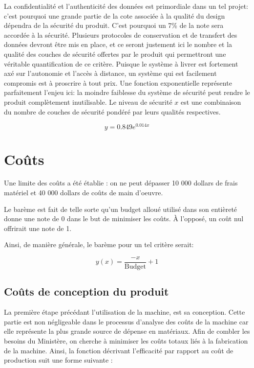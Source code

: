 La confidentialité et l'authenticité des données est primordiale dans un tel projet: c'est pourquoi une grande partie de la cote associée à la qualité du design dépendra de la sécurité du produit. C'est pourquoi un 7\% de la note sera accordée à la sécurité. Plusieurs protocoles de conservation et de transfert des données devront être mis en place, et ce seront justement ici le nombre et la qualité des couches de sécurité offertes par le produit qui permettront une véritable quantification de ce critère. Puisque le système à livrer est fortement axé sur l'autonomie et l'accès à distance, un système qui est facilement compromis est à proscrire à tout prix. Une fonction exponentielle représente parfaitement l'enjeu ici: la moindre faiblesse du système de sécurité peut rendre le produit complètement inutilisable. Le niveau de sécurité $x$ est une combinaison du nombre de couches de sécurité pondéré par leurs qualités respectives.

\begin{equation}
    y = 0.849 e^{0.014x}
    \label{eq:bareme_sécurité}
\end{equation}

\section{Coûts}

Une limite des coûts a été établie : on ne peut dépasser 10 000 dollars de frais matériel et 40 000 dollars de coûts de main d'oeuvre. 

Le barème est fait de telle sorte qu'un budget alloué utilisé dans son entièreté donne une note de 0 dans le but de minimiser les coûts. À l'opposé, un coût nul offrirait une note de 1.

Ainsi, de manière générale, le barème pour un tel critère serait:

\begin{equation}
    y(x)=\frac{-x}{\text{Budget}} + 1
\end{equation}

\subsection{Coûts de conception du produit}

La première étape précédant l’utilisation de la machine, est sa conception. Cette partie est non négligeable dans le processus d’analyse des coûts de la machine car elle représente la plus grande source de dépense en matériaux. Afin de combler les besoins du Ministère, on cherche à minimiser les coûts totaux liés à la fabrication de la machine. %
Ainsi, la fonction décrivant l’efficacité par rapport au coût de production suit une forme suivante :

